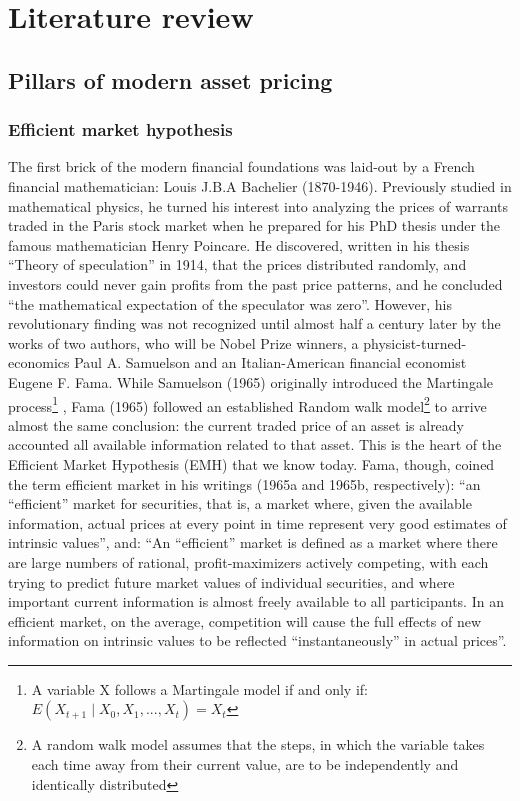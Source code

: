 \section{Literature review}

\subsection{Pillars of modern asset pricing}
\subsubsection{Efficient market hypothesis}
The first brick of the modern financial foundations was laid-out by a French financial mathematician: Louis J.B.A Bachelier (1870-1946). Previously studied in mathematical physics, he turned his interest into analyzing the prices of warrants traded in the Paris stock market when he prepared for his PhD thesis under the famous mathematician Henry Poincare. He discovered, written in his thesis “Theory of speculation” in 1914, that the prices distributed randomly, and investors could never gain profits from the past price patterns, and he concluded “the mathematical expectation of the speculator was zero”. However, his revolutionary finding was not recognized until almost half a century later by the works of two authors, who will be Nobel Prize winners, a physicist-turned-economics Paul A. Samuelson and an Italian-American financial economist Eugene F. Fama. While Samuelson (1965) originally introduced the Martingale process\footnote{A variable X follows a Martingale model if and only if: $ E(X_{t+1} \mid X_0,X_1,...,X_t) = X_t $} , Fama (1965) followed an established Random walk model\footnote{A random walk model assumes that the steps, in which the variable takes each time away from their current value, are to be independently and identically distributed}  to arrive almost the same conclusion: the current traded price of an asset is already accounted all available information related to that asset. This is the heart of the Efficient Market Hypothesis (EMH) that we know today. Fama, though, coined the term efficient market in his writings (1965a and 1965b, respectively):
	“an “efficient” market for securities, that is, a market where, given the available information, actual prices at every point in time represent very good estimates of intrinsic values”, and:
“An “efficient” market is defined as a market where there are large numbers of rational, profit-maximizers actively competing, with each trying to predict future market values of individual securities, and where important current information is almost freely available to all participants. In an efficient market, on the average, competition will cause the full effects of new information on intrinsic values to be reflected “instantaneously” in actual prices”.
